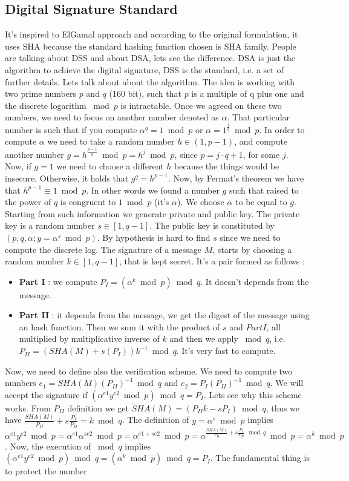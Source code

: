 \documentclass[11pt]{article}
\begin{document}
\subsection{Digital Signature Standard}
It’s inspired to ElGamal approach and according to the original formulation, it uses SHA because the standard hashing function chosen is SHA family. People are talking about DSS and about DSA, lets see the difference. DSA is just the algorithm to achieve the digital signature, DSS is the standard, i.e. a set of further details. Lets talk about about the algorithm. The idea is working with two prime numbers $p$ and $q$ (160 bit), such that $p$ is a multiple of q plus one and the discrete logarithm $\bmod p$ is intractable. Once we agreed on these two numbers, we need to focus on another number denoted as $\alpha$. That particular number is such that if you compute $\alpha^q = 1 \bmod p$ or $\alpha = 1^{\frac{1}{q}} \bmod p$. In order to compute $\alpha$ we need to take a random number $h \in (1, p - 1)$, and
compute another number $g = h^{\frac{p - 1}{q}} \bmod p = h^j \bmod p$, since $p = j\cdot q + 1$, for some $j$. Now, if $g = 1$ we need to choose a different $h$ because the things would be insecure. Otherwise, it holds that $g^q = h^{p - 1}$. Now, by Fermat's theorem we have that $h^{p -1} \equiv 1 \bmod p$. In other words we found a number $g$ such that raised to the power of $q$ is congruent to $1 \bmod p$ (it's $\alpha$). We choose $\alpha$ to be equal to $g$. Starting from such information we generate private and public key. The private key is a random number $s \in [1, q - 1]$. The public key is constituted by $(p, q, \alpha; y = \alpha^s \bmod p)$. By hypothesis is hard to find $s$ since we need to compute the discrete log. The signature of a message $M$, starts by choosing a random number $k \in [1, q - 1]$, that is kept secret. It’s a pair formed as follows :
\begin{itemize}
\item \textbf{Part I} : we compute $P_I = (\alpha^k \bmod p) \bmod q$. It doesn't depends from the message.
\item \textbf{Part II} : it depends from the message, we get the digest of the message using an hash function. Then we sum it with the product of $s$ and $Part I$, all multiplied by multiplicative inverse of $k$ and then we apply $\bmod q$, i.e. $P_{II} = (SHA(M) + s (P_I)) k^{-1} \bmod q$. It's very fast to compute.
\end{itemize}
Now, we need to define also the verification scheme. We need to compute two numbers $e_1 = SHA(M)(P_{II})^{-1} \bmod q$ and $e_2 = P_I(P_{II})^{-1} \bmod q$. We will accept the signature if $(\alpha^{e1} y^{e2} \bmod p) \bmod q = P_I$. Lets see why this scheme works. From $P_{II}$ definition we get $SHA(M) = (P_{II} k - s P_I) \bmod q$, thus we have $\frac{SHA(M)}{P_{II}} + s \frac{P_I}{P_{II}} = k \bmod q$. The definition of $y = \alpha^s \bmod p$ implies $\alpha^{e1} y^{e2} \bmod p = \alpha^{e1} \alpha^{s e2} \bmod p = \alpha^{e1 + s e2} \bmod p = \alpha^{\frac{SHA(M)}{P_{II}} + s \frac{P_I}{P_{II}} \mod q} \bmod p = \alpha^k \bmod p$. Now, the execution of $\bmod q$ implies $(\alpha^{e1} y^{e2} \bmod p) \bmod q = (\alpha^k \bmod p) \bmod q = P_I$. The fundamental thing is to protect the number
\end{document}
